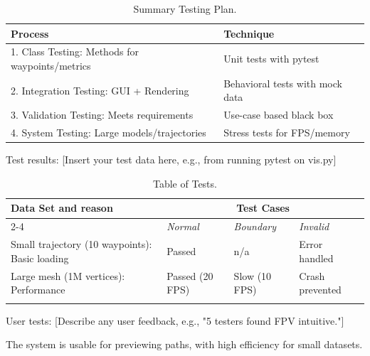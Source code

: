 \documentclass[11pt,a4paper]{article}
\begin{document}
\begin{table}[h!]
  \centering
\caption{Summary Testing Plan.}

\begin{tabular}[t]{|p{8cm}|p{7cm}|} \hline

  \textbf{Process} & \textbf{Technique} \\ \hline 1. Class
    Testing: Methods for waypoints/metrics & Unit tests with pytest \\ \hline 2. Integration Testing:
    GUI + Rendering & Behavioral tests with mock data \\ 
    \hline 3. Validation Testing: Meets requirements & Use-case based black box \\ 
    \hline 4. System Testing: Large models/trajectories & Stress tests for FPS/memory \\ \hline

\end{tabular}

\label{tab:test-plan}
\end{table}

Test results: [Insert your test data here, e.g., from running pytest on vis.py]

\begin{table}[h!]
  \centering
\caption{Table of Tests.}

  \begin{tabular}[t]{|p{5.5cm}|p{3cm}|p{3cm}|p{3cm}|} \hline \textbf{Data Set
    and reason} & \multicolumn{3}{c|}{\textbf{Test Cases}}\\
    \cline{2-4} & \emph{Normal} & \emph{Boundary} &
    \emph{Invalid} \\ \hline Small trajectory (10 waypoints): Basic loading & Passed & n/a & Error handled \\\hline Large mesh (1M vertices): Performance & Passed (20 FPS) & Slow (10 FPS) & Crash prevented \\\hline &&&\\ \hline
  \end{tabular}

\label{tab:tests}
\end{table}

User tests: [Describe any user feedback, e.g., "5 testers found FPV intuitive."]

The system is usable for previewing paths, with high efficiency for small datasets.
\end{document}
